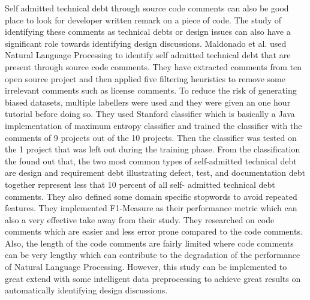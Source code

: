 Self admitted technical debt through source code comments can also be good place to look for developer written remark on a piece of code. The study of identifying these comments as technical debts or design issues can also have a significant role towards identifying design discussions. Maldonado et al. \cite{Maldonado2017} used Natural Language Processing to identify self admitted technical debt that are present through source code comments. They have extracted comments from ten open source project and then applied five filtering heuristics to remove some irrelevant comments such as license comments. To reduce the risk of generating biased datasets, multiple labellers were used and they were given an one hour tutorial before doing so. They used Stanford classifier which is basically a Java implementation of maximum entropy classifier and trained the classifier with the comments of 9 projects out of the 10 projects. Then the classifier was tested on the 1 project that was left out during the training phase. From the classification the found out that, the two most common types of self-admitted technical debt are design and requirement debt illustrating defect, test, and documentation debt together represent less that 10 percent of all self- admitted technical debt comments. They also defined some domain specific stopwords to avoid repeated features. They implemented F1-Measure as their performance metric which can also a very effective take away from their study. They researched on code comments which are easier and less error prone compared to the code comments. Also, the length of the code comments are fairly limited where code comments can be very lengthy which can contribute to the degradation of the performance of Natural Language Processing. However, this study can be implemented to great extend with some intelligent data preprocessing to achieve great results on automatically identifying design discussions.

